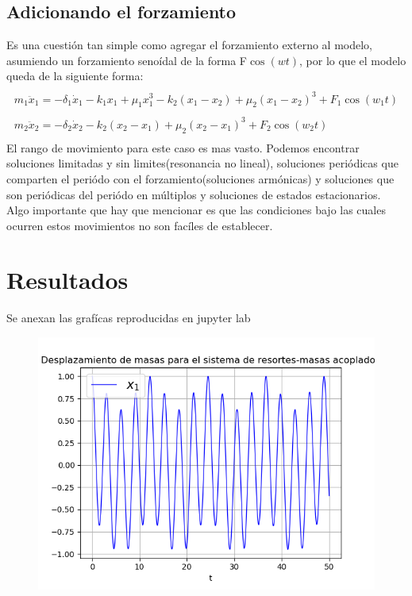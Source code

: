 \documentclass{article}
\begin{document}
\subsection{Adicionando el forzamiento}
Es una cuestión tan simple como agregar el forzamiento externo al modelo, asumiendo un forzamiento senoídal de la forma F$\cos(wt)$, por lo que el modelo queda de la siguiente forma:
\begin{equation}
\begin{aligned}
\\m_1\ddot x_1= -\delta_1\dot x_1-k_1x_1+\mu_1x_1^{3}-k_2(x_1-x_2)+\mu_2(x_1-x_2)^3+F_1\cos(w_1t)\\
\\m_2\ddot x_2= -\delta_2\dot x_2-k_2(x_2-x_1)+\mu_2(x_2-x_1)^3+F_2\cos(w_2t)\\
\end{aligned}
\end{equation}
El rango de movimiento para este caso es mas vasto. Podemos encontrar soluciones limitadas y sin limites(resonancia no lineal), soluciones periódicas que comparten el periódo con el forzamiento(soluciones armónicas) y soluciones que son periódicas del periódo en múltiplos y soluciones de estados estacionarios. Algo importante que hay que mencionar es que las condiciones bajo las cuales ocurren estos movimientos no son facíles de establecer.

\section{Resultados}
Se anexan las grafícas reproducidas en jupyter lab

\begin{figure}[H]
\centering
\includegraphics[scale=0.59]{31_d1.png}
\end{figure}
\end{document}
